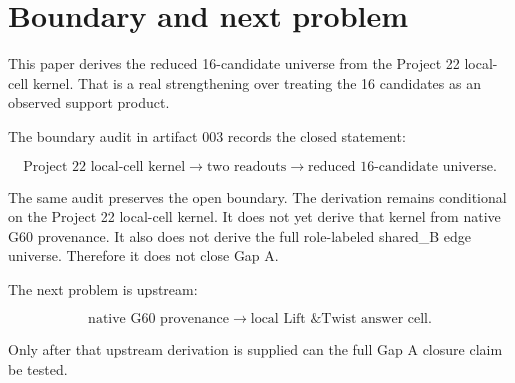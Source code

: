 \section{Boundary and next problem}

This paper derives the reduced 16-candidate universe from the Project 22 local-cell kernel.  That is a real strengthening over treating the 16 candidates as an observed support product.

The boundary audit in artifact 003 records the closed statement:

\[
    \text{Project 22 local-cell kernel}
    \longrightarrow
    \text{two readouts}
    \longrightarrow
    \text{reduced 16-candidate universe}.
\]

The same audit preserves the open boundary.  The derivation remains conditional on the Project 22 local-cell kernel.  It does not yet derive that kernel from native G60 provenance.  It also does not derive the full role-labeled shared\_B edge universe.  Therefore it does not close Gap A.

The next problem is upstream:

\[
    \text{native G60 provenance}
    \longrightarrow
    \text{local Lift \& Twist answer cell}.
\]

Only after that upstream derivation is supplied can the full Gap A closure claim be tested.

